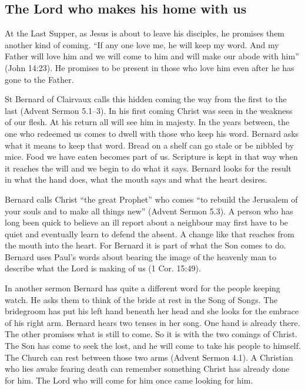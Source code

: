 \subsection{The Lord who makes his home with us}

At the Last Supper, as Jesus is about to leave his disciples, he promises them
another kind of coming. “If any one love me, he will keep my word. And my
Father will love him and we will come to him and will make our abode with him”
(John 14:23). He promises to be present in those who love him even after he
has gone to the Father.

St Bernard of Clairvaux calls this hidden coming the way from the first to the
last (Advent Sermon 5.1--3). In his first coming Christ was seen in the
weakness of our flesh. At his return all will see him in majesty. In the years
between, the one who redeemed us comes to dwell with those who keep his word.
Bernard asks what it means to keep that word. Bread on a shelf can go stale or
be nibbled by mice. Food we have eaten becomes part of us. Scripture is kept
in that way when it reaches the will and we begin to do what it says. Bernard
looks for the result in what the hand does, what the mouth says and what the
heart desires.

Bernard calls Christ “the great Prophet” who comes “to rebuild the
Jerusalem of your souls and to make all things new” (Advent Sermon 5.3).
A person who has long been quick to believe an ill report about a neighbour
may first have to be quiet and eventually learn to defend the absent. A change
like that reaches from the mouth into the heart. For Bernard it is part of
what the Son comes to do. Bernard uses Paul's words about bearing the image
of the heavenly man to describe what the Lord is making of us (1 Cor.
15:49).

In another sermon Bernard has quite a different word for the people
keeping watch. He asks them to think of the bride at rest in the Song
of Songs. The bridegroom has put his left hand beneath her head and she
looks for the embrace of his right arm. Bernard hears two tenses in
her song. One hand is already there. The other promises what is still
to come. So it is with the two comings of Christ. The Son has come to
seek the lost, and he will come to take his people to himself. The
Church can rest between those two arms (Advent Sermon 4.1). A Christian
who lies awake fearing death can remember something Christ has already
done for him. The Lord who will come for him once came looking for him.

